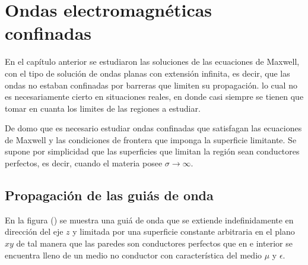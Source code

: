 \documentclass[11pt,fleqn]{book} %
\begin{document}

\pagestyle{empty} %
\tableofcontents %
\cleardoublepage %

\pagestyle{fancy} %


\chapter{Ondas electromagn\'eticas confinadas}
En el capítulo anterior se estudiaron las soluciones de las ecuaciones de Maxwell, con el tipo de solución de ondas planas con extensión infinita, es decir, que las ondas no estaban confinadas por barreras que limiten su propagación. lo cual no es necesariamente cierto en situaciones reales, en donde casi siempre se tienen que tomar en cuanta los limites de las regiones a estudiar.

De domo que es necesario estudiar ondas confinadas que satisfagan las ecuaciones de Maxwell y las condiciones de frontera que imponga la superficie limitante. Se supone por simplicidad que las superficies que limitan la región sean conductores perfectos, es decir, cuando el materia posee $\sigma \longrightarrow \infty$.

\section{Propagaci\'on de las guiás de onda}

En la figura () se muestra una guiá de onda que se extiende indefinidamente en dirección del eje $z$ y limitada por una superficie constante arbitraria en el plano $xy$ de tal manera que las paredes son conductores perfectos  que en e interior se encuentra lleno de un medio no conductor con característica del medio $\mu$ y $\epsilon$.
\end{document}
